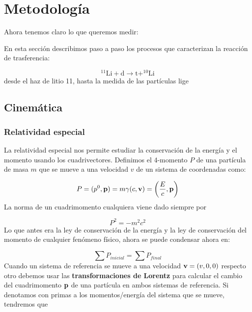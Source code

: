\section{Metodología}

Ahora tenemos claro lo que queremos medir: 

En esta sección describimos paso a paso los procesos que caracterizan la reacción de trasferencia:

\begin{equation}
    ^{11} \text{Li} +  \text{d} \to  \text{t} + ^{10}  \text{Li} 
\end{equation}
desde el haz de litio 11, hasta la medida de las partículas lige

\subsection{Cinemática}

\subsubsection{Relatividad especial}

La relatividad especial nos permite estudiar la conservación de la energía y el momento usando los cuadrivectores. Definimos el 4-momento $P$ de una partícula de masa $m$ que se mueve a una velocidad $v$ de un sistema de coordenadas como:

\begin{equation}
    P = (p^0, \mathbf{p}) = m \gamma (c,\mathbf{v}) =\left( \frac{E}{c},\mathbf{p} \right)   \label{Ec:01}
\end{equation}
La norma de un cuadrimomento cualquiera viene dado siempre por

\begin{equation}
    P^2  = - m^2 c^2  \label{Ec:02}
\end{equation}
Lo que antes era la ley de conservación de la energía y la ley de conservación del momento de cualquier fenómeno físico, ahora se puede condensar ahora en:

\begin{equation}
    \sum P_{inicial} = \sum P_{final} \label{Ec:03}
\end{equation}
Cuando un sistema de referencia se mueve a una velocidad $\mathbf{v}=(v,0,0)$ respecto otro debemos usar las \textbf{transformaciones de Lorentz} para calcular el cambio del cuadrimomento $\mathbf{p}$ de una partícula en ambos sistemas de referencia. Si denotamos con primas a los momentos/energía del sistema que se mueve, tendremos que

